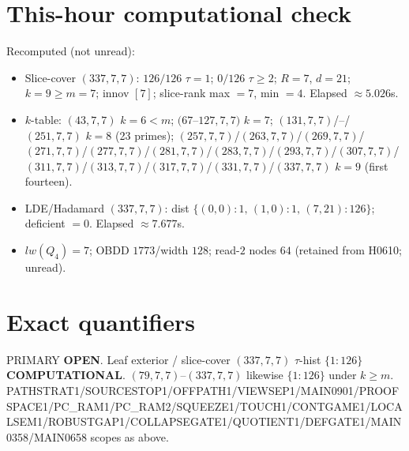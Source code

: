 \documentclass[11pt]{article}
\begin{document}
\section*{This-hour computational check}
Recomputed (not unread):
\begin{itemize}
\item Slice-cover $(337,7,7)$: $126/126$ $\tau{=}1$; $0/126$ $\tau{\ge}2$; $R{=}7$, $d{=}21$;
  $k{=}9{\ge}m{=}7$; innov $[7]$; slice-rank max $=7$, min $=4$. Elapsed $\approx5.026$s.
\item $k$-table: $(43,7,7)$ $k{=}6{\lt}m$; $(67$--$127,7,7)$ $k{=}7$;
  $(131,7,7)$/--/$(251,7,7)$ $k{=}8$ (23 primes); $(257,7,7)$/$(263,7,7)$/$(269,7,7)$/$(271,7,7)$/$(277,7,7)$/$(281,7,7)$/$(283,7,7)$/$(293,7,7)$/$(307,7,7)$/$(311,7,7)$/$(313,7,7)$/$(317,7,7)$/$(331,7,7)$/$(337,7,7)$ $k{=}9$ (first fourteen).
\item LDE/Hadamard $(337,7,7)$: dist $\{(0,0){:}1,\,(1,0){:}1,\,(7,21){:}126\}$; deficient $=0$. Elapsed $\approx7.677$s.
\item $lw(Q_4)=7$; OBDD $1773$/width $128$; read-$2$ nodes $64$ (retained from H0610; unread).
\end{itemize}

\section*{Exact quantifiers}
PRIMARY \textbf{OPEN}. Leaf exterior / slice-cover $(337,7,7)$ $\tau$-hist $\{1{:}126\}$ \textbf{COMPUTATIONAL}.
$(79,7,7)$--$(337,7,7)$ likewise $\{1{:}126\}$ under $k{\ge}m$.
PATHSTRAT1/SOURCESTOP1/OFFPATH1/VIEWSEP1/MAIN0901/PROOFSPACE1/PC\_RAM1/PC\_RAM2/SQUEEZE1/TOUCH1/CONTGAME1/LOCALSEM1/ROBUSTGAP1/COLLAPSEGATE1/QUOTIENT1/DEFGATE1/MAIN0358/MAIN0658 scopes as above.
\end{document}
